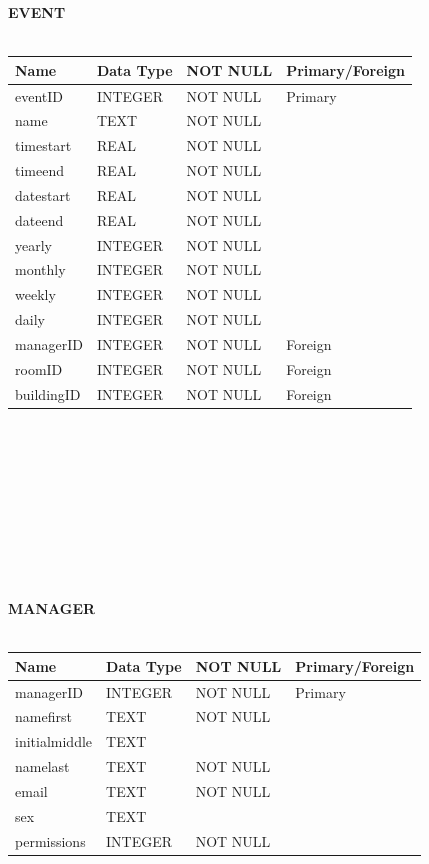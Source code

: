 \documentclass{article}
\begin{document}
\textbf{\Large EVENT}\\\\
\begin{tabularx}{\textwidth}{|X|X|X|X|}
    \hline
    \textbf{\large Name} & \textbf{\large Data Type} & \textbf{\large NOT NULL} & \textbf{\large Primary/Foreign} \\ \hline eventID & INTEGER & NOT NULL & Primary \\ \hline name & TEXT & NOT NULL & \\ \hline timestart & REAL & NOT NULL & \\ \hline timeend & REAL & NOT NULL & \\ \hline datestart & REAL & NOT NULL & \\ \hline dateend & REAL & NOT NULL & \\ \hline yearly & INTEGER & NOT NULL & \\ \hline monthly & INTEGER & NOT NULL & \\ \hline weekly & INTEGER & NOT NULL & \\ \hline daily & INTEGER & NOT NULL & \\ \hline managerID & INTEGER & NOT NULL & Foreign \\ \hline roomID & INTEGER & NOT NULL & Foreign \\ \hline buildingID & INTEGER & NOT NULL & Foreign \\ \hline
\end{tabularx}\\\\\\\\\\\\\\\\\\
\textbf{\Large MANAGER}\\\\
\begin{tabularx}{\textwidth}{|X|X|X|X|}
    \hline
    \textbf{\large Name} & \textbf{\large Data Type} & \textbf{\large NOT NULL} & \textbf{\large Primary/Foreign} \\ \hline managerID & INTEGER & NOT NULL & Primary \\ \hline namefirst & TEXT & NOT NULL & \\ \hline initialmiddle & TEXT & & \\ \hline namelast & TEXT & NOT NULL & \\ \hline email & TEXT & NOT NULL & \\ \hline sex & TEXT & & \\ \hline permissions & INTEGER & NOT NULL & \\ \hline 
\end{tabularx}\\\\\\
\end{document}
